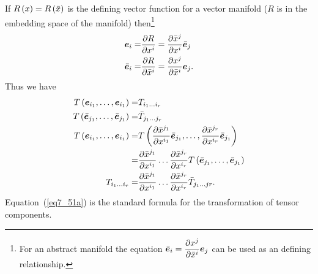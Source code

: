 If ${R}\left ( {x} \right ) = {R}\left ( {\bar{x}} \right )$ is the defining vector function for a vector manifold ($R$ is in the embedding space of the
manifold) then\footnote{For an abstract manifold the equation $\bar{\bm{e}}_{i} = \displaystyle\frac{\partial{x^{j}}}{\partial{\bar{x}^{i}}}\bm{e}_{j}$ can be
used as an defining relationship.}
\begin{align}
	\bm{e}_{i} =& \displaystyle\frac{\partial{R}}{\partial{x^{i}}} = \displaystyle\frac{\partial{\bar{x}^{j}}}{\partial{x^{i}}}\bar{\bm{e}}_{j} \\
	\bar{\bm{e}}_{i} =& \displaystyle\frac{\partial{R}}{\partial{\bar{x}^{i}}} =  \displaystyle\frac{\partial{x^{j}}}{\partial{\bar{x}^{i}}}\bm{e}_{j}.
\end{align}
Thus we have
\begin{align}
	{T}\left ( {\bm{e}_{i_{1}},\dots,\bm{e}_{i_{1}}} \right ) =& T_{i_{1}\dots i_{r}} \\
	{T}\left ( {\bar{\bm{e}}_{j_{1}},\dots,\bar{\bm{e}}_{j_{1}}} \right ) =& \bar{T}_{j_{1}\dots j_{r}} \\
	{T}\left ( {\bm{e}_{i_{1}},\dots,\bm{e}_{i_{1}}} \right ) =& {T}\left ( {\displaystyle\frac{\partial{\bar{x}^{j_{1}}}}{\partial{x^{i_{1}}}}\bar{\bm{e}}_{j_{1}},
	                                        \dots,\displaystyle\frac{\partial{\bar{x}^{j_{r}}}}{\partial{x^{i_{r}}}}\bar{\bm{e}}_{j_{1}}} \right ) \\
	                                     =& \displaystyle\frac{\partial{\bar{x}^{j_{1}}}}{\partial{x^{i_{1}}}}\dots \displaystyle\frac{\partial{\bar{x}^{j_{r}}}}{\partial{x^{i_{r}}}}
	                                     {T}\left ( {\bar{\bm{e}}_{j_{1}},\dots,\bar{\bm{e}}_{j_{1}}} \right ) \\
	T_{i_{1}\dots i_{r}} =&  \displaystyle\frac{\partial{\bar{x}^{j_{1}}}}{\partial{x^{i_{1}}}}\dots\displaystyle\frac{\partial{\bar{x}^{j_{r}}}}{\partial{x^{i_{r}}}}
	                                     \bar{T}_{j_{1}\dots j{r}}. \label{eq7_51a} 
\end{align}
Equation~(\ref{eq7_51a}) is the standard formula for the transformation of tensor components.
